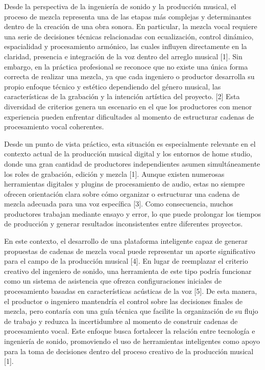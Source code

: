 Desde la perspectiva de la ingeniería de sonido y la producción musical, el proceso de mezcla representa una de las etapas más complejas y determinantes dentro de la creación de una obra sonora. En particular, la mezcla vocal requiere una serie de decisiones técnicas relacionadas con ecualización, control dinámico, espacialidad y procesamiento armónico, las cuales influyen directamente en la claridad, presencia e integración de la voz dentro del arreglo musical [1]. Sin embargo, en la práctica profesional se reconoce que no existe una única forma correcta de realizar una mezcla, ya que cada ingeniero o productor desarrolla su propio enfoque técnico y estético dependiendo del género musical, las características de la grabación y la intención artística del proyecto. [2] Esta diversidad de criterios genera un escenario en el que los productores con menor experiencia pueden enfrentar dificultades al momento de estructurar cadenas de procesamiento vocal coherentes.

Desde un punto de vista práctico, esta situación es especialmente relevante en el contexto actual de la producción musical digital y los entornos de home studio, donde una gran cantidad de productores independientes asumen simultáneamente los roles de grabación, edición y mezcla [1]. Aunque existen numerosas herramientas digitales y plugins de procesamiento de audio, estas no siempre ofrecen orientación clara sobre cómo organizar o estructurar una cadena de mezcla adecuada para una voz específica [3]. Como consecuencia, muchos productores trabajan mediante ensayo y error, lo que puede prolongar los tiempos de producción y generar resultados inconsistentes entre diferentes proyectos.

En este contexto, el desarrollo de una plataforma inteligente capaz de generar propuestas de cadenas de mezcla vocal puede representar un aporte significativo para el campo de la producción musical [4]. En lugar de reemplazar el criterio creativo del ingeniero de sonido, una herramienta de este tipo podría funcionar como un sistema de asistencia que ofrezca configuraciones iniciales de procesamiento basadas en características acústicas de la voz [5]. De esta manera, el productor o ingeniero mantendría el control sobre las decisiones finales de mezcla, pero contaría con una guía técnica que facilite la organización de su flujo de trabajo y reduzca la incertidumbre al momento de construir cadenas de procesamiento vocal. Este enfoque busca fortalecer la relación entre tecnología e ingeniería de sonido, promoviendo el uso de herramientas inteligentes como apoyo para la toma de decisiones dentro del proceso creativo de la producción musical [1].
